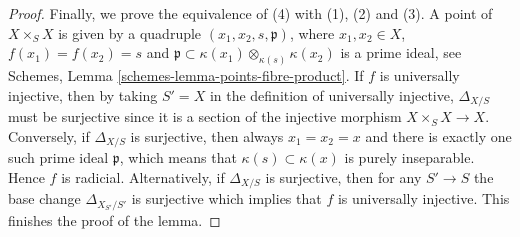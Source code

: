 \documentclass[10pt,a4paper]{amsart}
\theoremstyle{plain}
\theoremstyle{definition}
\theoremstyle{remark}
\numberwithin{equation}{subsection}
\begin{document}
\begin{proof}
\medskip\noindent
Finally, we prove the equivalence of (4) with (1), (2) and (3).
A point of $X \times_S X$ is given by a quadruple
$(x_1, x_2, s, \mathfrak p)$, where $x_1, x_2 \in X$,
$f(x_1) = f(x_2) = s$ and
$\mathfrak p \subset \kappa(x_1) \otimes_{\kappa(s)} \kappa(x_2)$
is a prime ideal, see
Schemes, Lemma \ref{schemes-lemma-points-fibre-product}.
If $f$ is universally injective, then
by taking $S'=X$ in the definition of universally injective,
$\Delta_{X/S}$ must be surjective since it is a section of
the injective morphism
$X \times_S X  \longrightarrow X$.
Conversely, if
$\Delta_{X/S}$ is surjective, then always $x_1 = x_2 = x$ and there
is exactly one such prime ideal $\mathfrak p$, which means that
$\kappa(s) \subset \kappa(x)$ is purely inseparable.
Hence $f$ is radicial.
Alternatively, if $\Delta_{X/S}$ is surjective,
then for any $S' \to S$ the base
change $\Delta_{X_{S'}/S'}$ is surjective which implies that $f$
is universally injective. This finishes the proof of the lemma.
\end{proof}
\end{document}

